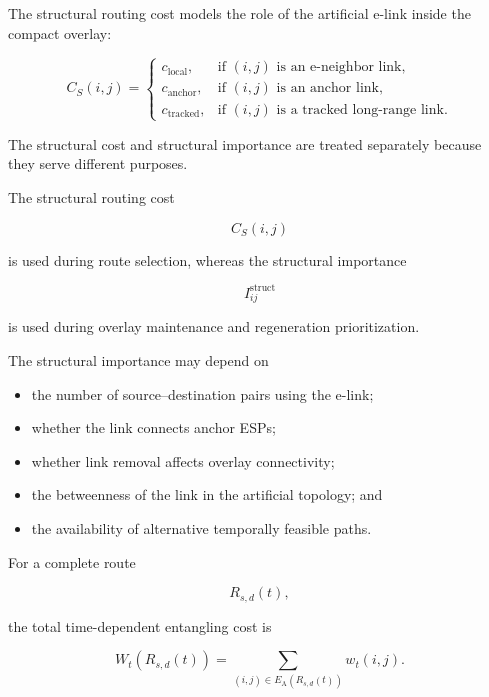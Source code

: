 The structural routing cost models the role of the artificial e-link inside the compact overlay:

\begin{equation}
    C_S(i,j)
    =
    \begin{cases}
        c_{\mathrm{local}},
        & \text{if $(i,j)$ is an e-neighbor link},\\
        c_{\mathrm{anchor}},
        & \text{if $(i,j)$ is an anchor link},\\
        c_{\mathrm{tracked}},
        & \text{if $(i,j)$ is a tracked long-range link}.
    \end{cases}
\end{equation}

The structural cost and structural importance are treated separately because they serve different purposes.

The structural routing cost

\begin{equation}
    C_S(i,j)
\end{equation}

is used during route selection, whereas the structural importance

\begin{equation}
    I_{ij}^{\mathrm{struct}}
\end{equation}

is used during overlay maintenance and regeneration prioritization.

The structural importance may depend on

\begin{itemize}
    \item the number of source--destination pairs using the e-link;
    \item whether the link connects anchor ESPs;
    \item whether link removal affects overlay connectivity;
    \item the betweenness of the link in the artificial topology; and
    \item the availability of alternative temporally feasible paths.
\end{itemize}

For a complete route

\begin{equation}
    R_{s,d}(t),
\end{equation}

the total time-dependent entangling cost is

\begin{equation}
    W_t
    \left(
    R_{s,d}(t)
    \right)
    =
    \sum_{
    (i,j)
    \in
    E_{\mathrm{A}}
    (R_{s,d}(t))
    }
    w_t(i,j).
\end{equation}

